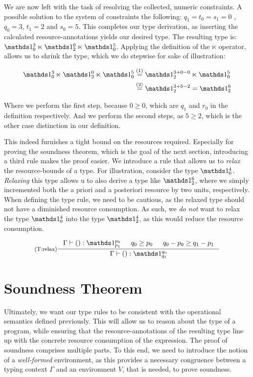 We are now left with the task of resolving the collected, numeric constraints. A possible solution to the system of constraints the following: \(q_1 = t_0 = s_1 = 0\) , \(q_0 = 3\), \(t_1 = 2\) and \(s_0 = 5\). This completes our type derivation, as inserting the calculated resource-annotations yields our desired type. The resulting type is: \(\unit^{3}_{0} \ltimes \unit^{0}_{2} \ltimes \unit^{5}_{0}\).
Applying the definition of the \(\ltimes\) operator, allows us to shrink the type, which we do stepwise for sake of illustration:

\begin{align*}
   \unit^{3}_{0} \ltimes \unit^{0}_{2} \ltimes \unit^{5}_{0} &\stackrel{(1)}{=} \unit^{3 + 0 - 0}_2 \ltimes \unit^5_0\\
                                                             &\stackrel{(2)}{=} \unit^{3 + 5 - 2}_2 = \unit^6_2
\end{align*}

Where we perform the first step, because \( 0 \geq 0\), which are \(q_1\) and \(r_0\) in the definition respectively. And we perform the second steps, as \(5 \geq 2\), which is the other case distinction in our definition.

This indeed furnishes a tight bound on the resources required. Especially for proving the soundness theorem, which is the goal of the next section, introducing a third rule makes the proof easier. We introduce a rule that allows us to \emph{relax} the resource-bounds of a type. For illustration, consider the type \(\unit^4_0\). \emph{Relaxing} this type allows u to also derive a type like \(\unit^6_2\), where we simply incremented both the a priori and a posteriori resource by two units, respectively. When defining the type rule, we need to be cautious, as the relaxed type should not have a diminished resource consumption. As such, we \emph{do not} want to relax the type \(\unit^4_0\) into the type \(\unit^4_2\), as this would reduce the resource consumption.

\[
   \inference[(T:relax)]
   {\Gamma \vdash () : \unit^{p_0}_{p_1}
      & 
   q_0 \geq p_0
      &
   q_0 - p_0 \geq q_1 - p_1}
   {\Gamma \vdash () : \unit^{q_0}_{q_1}}
\]


\section{Soundness Theorem}
Ultimately, we want our type rules to be consistent with the operational semantics defined previously. This will allow us to reason about the type of a program, while ensuring that the resource-annotations of the resulting type line up with the concrete resource consumption of the expression.
The proof of soundness comprises multiple parts. To this end, we need to introduce the notion of a \emph{well-formed} environment, as this provides a necessary congruence between a typing context \(\Gamma\) and an environment \(V\), that is needed, to prove soundness.

